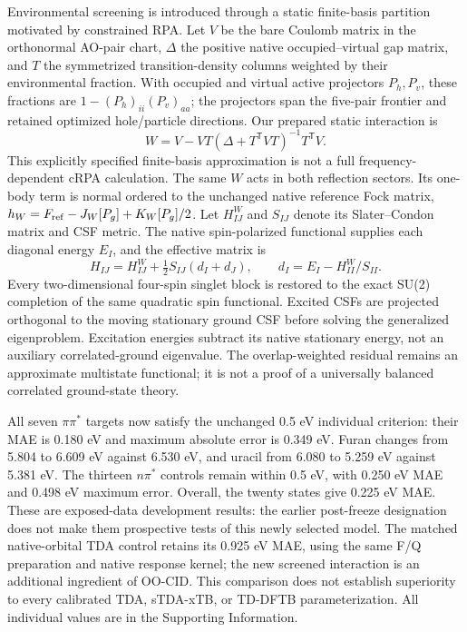 \documentclass[11pt,a4paper]{article}
\begin{document}
Environmental screening is introduced through a static finite-basis partition
motivated by constrained RPA.\cite{crpa2004} Let $V$ be the bare Coulomb
matrix in the orthonormal AO-pair chart, $\Delta$ the positive native
occupied--virtual gap matrix, and $T$ the symmetrized transition-density
columns weighted by their environmental fraction. With occupied and virtual
active projectors $P_h,P_v$, these fractions are
$1-(P_h)_{ii}(P_v)_{aa}$; the projectors span the five-pair frontier and
retained optimized hole/particle directions. Our prepared static interaction is
\begin{equation}
 W=V-VT(\Delta+T^{\mathsf T}VT)^{-1}T^{\mathsf T}V.
\end{equation}
This explicitly specified finite-basis approximation is not a full
frequency-dependent cRPA calculation. The same $W$ acts in both reflection
sectors. Its one-body term is normal ordered to the unchanged native reference
Fock matrix, $h_W=F_{\rm ref}-J_W[P_g]+K_W[P_g]/2$.
Let $H^W_{IJ}$ and $S_{IJ}$ denote its Slater--Condon matrix and CSF metric.
The native spin-polarized functional supplies each diagonal energy $E_I$,
and the effective matrix is
\begin{equation}
 H_{IJ}=H^W_{IJ}+\tfrac12S_{IJ}(d_I+d_J),\qquad
 d_I=E_I-H^W_{II}/S_{II}.
\end{equation}
Every two-dimensional four-spin singlet block is restored to the exact
SU(2) completion of the same quadratic spin functional. Excited CSFs are
projected orthogonal to the moving stationary ground CSF before solving
the generalized eigenproblem. Excitation energies subtract its native
stationary energy, not an auxiliary correlated-ground eigenvalue.
The overlap-weighted residual remains an approximate multistate functional;
it is not a proof of a universally balanced correlated ground-state theory.

All seven $\pi\pi^*$ targets now satisfy the unchanged 0.5 eV individual
criterion: their MAE is 0.180 eV and maximum absolute error is 0.349 eV.
Furan changes from 5.804 to 6.609 eV against 6.530 eV, and uracil from
6.080 to 5.259 eV against 5.381 eV. The thirteen $n\pi^*$ controls remain
within 0.5 eV, with 0.250 eV MAE and 0.498 eV maximum error. Overall,
the twenty states give 0.225 eV MAE. These are exposed-data development
results: the earlier post-freeze designation does not make them prospective
tests of this newly selected model. The matched native-orbital TDA control
retains its 0.925 eV MAE, using the same F/Q preparation and native response
kernel; the new screened interaction is an additional ingredient of OO-CID.
This comparison does not establish superiority to every calibrated TDA,
sTDA-xTB, or TD-DFTB parameterization. All individual values are in the
Supporting Information.
\end{document}
